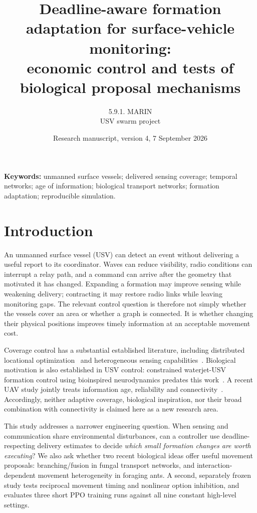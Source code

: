 \documentclass[10pt,a4paper,twocolumn]{article}
\title{\vspace{-7mm}Deadline-aware formation adaptation for surface-vehicle monitoring:\\
economic control and tests of biological proposal mechanisms}
\author{5.9.1. MARIN\\[-1mm]\small USV swarm project}
\date{\small Research manuscript, version 4, 7 September 2026}
\newcommand{\1}{\mathbf 1}
\begin{document}
\maketitle
\begin{abstract}

\end{abstract}
\noindent\textbf{Keywords:} unmanned surface vessels; delivered sensing coverage;
temporal networks; age of information; biological transport networks;
formation adaptation; reproducible simulation.

\section{Introduction}
An unmanned surface vessel (USV) can detect an event without delivering a useful
report to its coordinator. Waves can reduce visibility, radio conditions can
interrupt a relay path, and a command can arrive after the geometry that motivated
it has changed. Expanding a formation may improve sensing while weakening delivery;
contracting it may restore radio links while leaving monitoring gaps. The relevant
control question is therefore not simply whether the vessels cover an area or
whether a graph is connected. It is whether changing their physical positions
improves timely information at an acceptable movement cost.

Coverage control has a substantial established literature, including distributed
locational optimization~\cite{cortes2004} and heterogeneous sensing
capabilities~\cite{santos2018}. Biological motivation is also established in USV
control: constrained waterjet-USV formation control using bioinspired
neurodynamics predates this work~\cite{wang2019}. A recent UAV study jointly treats
information age, reliability and connectivity~\cite{bafarassat2026}. Accordingly,
neither adaptive coverage, biological inspiration, nor their broad combination
with connectivity is claimed here as a new research area.

This study addresses a narrower engineering question. When sensing and
communication share environmental disturbances, can a controller use
deadline-respecting delivery estimates to decide \emph{which small formation
changes are worth executing}? We also ask whether two recent biological ideas
offer useful movement proposals: branching/fusion in fungal transport networks,
and interaction-dependent movement heterogeneity in foraging ants. A second, separately frozen study tests reciprocal movement timing and nonlinear option inhibition, and evaluates three short PPO training runs against all nine constant high-level settings.
\end{document}
